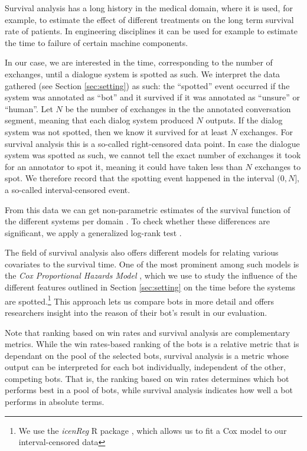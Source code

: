 \documentclass[11pt,a4paper]{article}
\begin{document}
Survival analysis has a long history in the medical domain, where it is used, for example, to estimate the effect of different treatments on the long term survival rate of patients. In engineering disciplines it can be used for example to estimate the time to failure of certain machine components.

In our case, we are interested in the time, corresponding to the number of exchanges, until a dialogue system is spotted as such. We interpret the data gathered (see Section \ref{sec:setting}) as such: the ``spotted'' event occurred if the system was annotated as ``bot'' and it survived if it was annotated as ``unsure'' or ``human''. Let $N$ be the number of exchanges in the the annotated conversation segment, meaning that each dialog system produced $N$ outputs. If the dialog system was not spotted, then we know it survived for at least $N$ exchanges. For survival analysis this is a so-called right-censored data point. In case the dialogue system was spotted as such, we cannot tell the exact number of exchanges it took for an annotator to spot it, meaning it could have taken less than $N$ exchanges to spot. We therefore record that the spotting event happened in the interval $(0, N]$, a so-called interval-censored event.

From this data we can get non-parametric estimates of the survival function of the different systems per domain \citep{nonparametric_survival_censored}.  To check whether these differences are significant, we apply a generalized log-rank test \citep{generalized_logranktest_zhao2004}.

The field of survival analysis also offers different models for relating various covariates to the survival time. One of the most prominent among such models is the \emph{Cox Proportional Hazards Model} \citep{cox_ph_model}, which we use to study the influence of the different features outlined in Section \ref{sec:setting} on the time before the systems are spotted.\footnote{We use the \emph{icenReg} R package \citep{icenReg}, which allows us to fit a Cox model to our interval-censored data} This approach lets us compare bots in more detail and offers researchers insight into the reason of their bot's result in our evaluation.

Note that ranking based on win rates and survival analysis are complementary metrics. While the win rates-based ranking of the bots is a relative metric that is dependant on the pool of the selected bots, survival analysis is a metric whose output can be interpreted for each bot individually, independent of the other, competing bots. That is, the ranking based on win rates determines which bot performs best in a pool of bots, while survival analysis indicates how well a bot performs in absolute terms.
\end{document}
